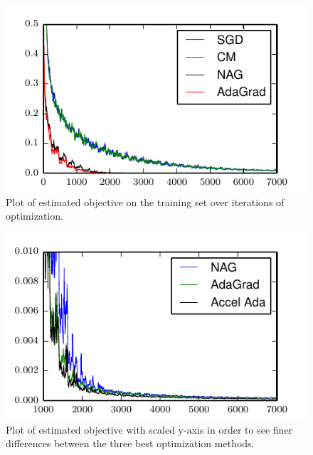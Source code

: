 \documentclass[12pt,english]{article}
\newcommand{\1}{\mathbb{I}} %
\begin{document}
\begin{figure}[h!]
    \centering
    \includegraphics{../plots/allcurves.pdf}
    \caption{\label{fig:allcurves} Plot of estimated objective on the training
set over iterations of optimization.}
\end{figure}

\begin{figure}[h!]
    \centering
    \includegraphics{../plots/bestcurves.pdf}
    \caption{\label{fig:bestcurves} Plot of estimated objective with scaled
y-axis in order to see finer differences between the three best optimization
methods.}
\end{figure}

{}

\end{document}
